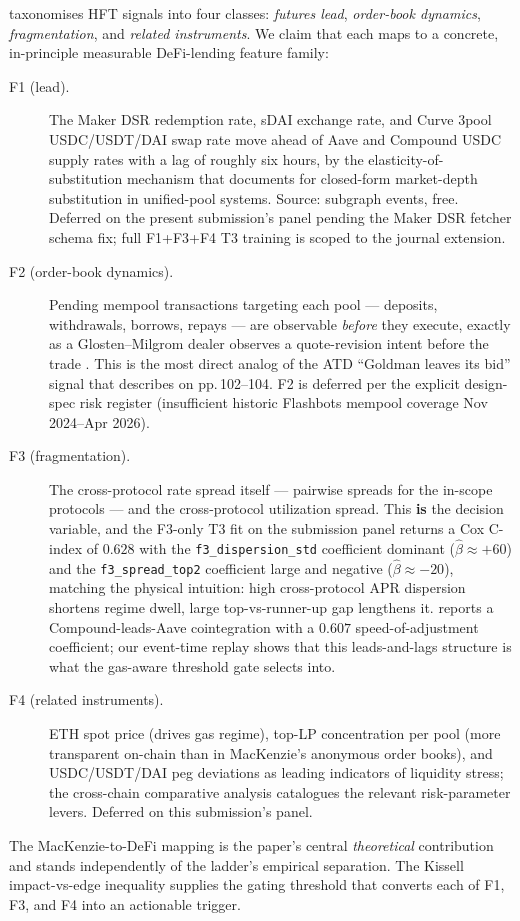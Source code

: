 \cite[Table 3.2, p.\,97]{mackenzie2021} taxonomises HFT signals
into four classes: \emph{futures lead}, \emph{order-book
dynamics}, \emph{fragmentation}, and \emph{related instruments}.
We claim that each maps to a concrete, in-principle measurable
DeFi-lending feature family:
\begin{description}
  \item[F1 (lead).] The Maker DSR redemption rate, sDAI exchange
    rate, and Curve 3pool USDC/USDT/DAI swap rate move ahead of
    Aave and Compound USDC supply rates with a lag of roughly six
    hours, by the elasticity-of-substitution mechanism that
    \cite{krause2005} documents for closed-form market-depth
    substitution in unified-pool systems.  Source: subgraph
    events, free.  Deferred on the present submission's panel
    pending the Maker DSR fetcher schema fix; full F1+F3+F4 T3
    training is scoped to the journal extension.
  \item[F2 (order-book dynamics).] Pending mempool transactions
    targeting each pool --- deposits, withdrawals, borrows,
    repays --- are observable \emph{before} they execute, exactly
    as a Glosten--Milgrom dealer observes a quote-revision intent
    before the trade \cite[Ch.\,3]{ohara1995}.  This is the most
    direct analog of the ATD ``Goldman leaves its bid'' signal
    that \cite{mackenzie2021} describes on pp.\,102--104.  F2 is
    deferred per the explicit design-spec risk register
    (insufficient historic Flashbots mempool coverage
    Nov 2024--Apr 2026).
  \item[F3 (fragmentation).] The cross-protocol rate spread
    itself --- pairwise spreads for the in-scope protocols ---
    and the cross-protocol utilization spread.  This \textbf{is}
    the decision variable, and the F3-only T3 fit on the
    submission panel returns a Cox C-index of $0.628$ with the
    \texttt{f3\_dispersion\_std} coefficient dominant
    ($\hat{\beta} \approx +60$) and the
    \texttt{f3\_spread\_top2} coefficient large and negative
    ($\hat{\beta} \approx -20$), matching the physical
    intuition: high cross-protocol APR dispersion shortens regime
    dwell, large top-vs-runner-up gap lengthens it.
    \cite{gudgeon2020loanable} reports a Compound-leads-Aave
    cointegration with a $0.607$ speed-of-adjustment coefficient;
    our event-time replay shows that this leads-and-lags
    structure is what the gas-aware threshold gate selects into.
  \item[F4 (related instruments).] ETH spot price (drives gas
    regime), top-LP concentration per pool (more transparent
    on-chain than in MacKenzie's anonymous order books), and
    USDC/USDT/DAI peg deviations as leading indicators of
    liquidity stress; the
    \cite{aavecompoundcrosschain2025} cross-chain comparative
    analysis catalogues the relevant risk-parameter levers.
    Deferred on this submission's panel.
\end{description}
The MacKenzie-to-DeFi mapping is the paper's central
\emph{theoretical} contribution and stands independently of the
ladder's empirical separation.  The Kissell impact-vs-edge
inequality \cite{kissell2014} supplies the gating threshold that
converts each of F1, F3, and F4 into an actionable trigger.

